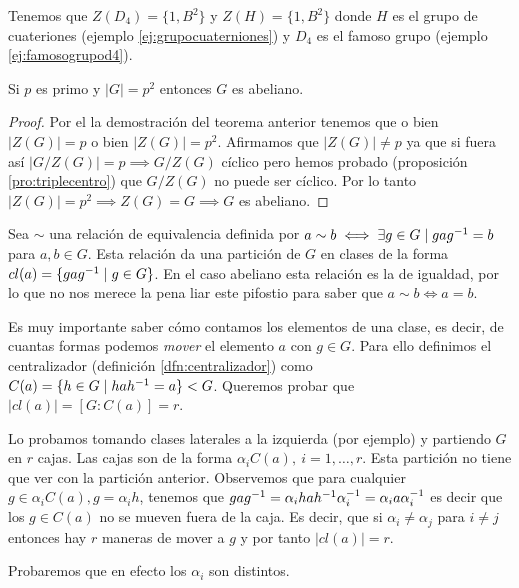 \begin{ej}
	Tenemos que $Z(D_4) = \{1,B^2\}$ y $Z(H) = \{1, B^2\}$ donde $H$ es el grupo de cuateriones (ejemplo \ref{ej:grupocuaterniones}) y $D_4$ es el famoso grupo (ejemplo \ref{ej:famosogrupod4}). 
\end{ej}

\begin{pro}
	\label{pro:primocuadradoabeliano}
	Si $p$ es primo y $|G| = p^2$ entonces $G$ es abeliano.
\end{pro}

\begin{proof}
	Por el la demostración del teorema anterior tenemos que o bien $|Z(G)| = p$ o bien $|Z(G)| = p^2$. Afirmamos que $|Z(G)| \neq p$ ya que si fuera así $|G/Z(G)| = p \implies G/Z(G)$ cíclico pero hemos probado (proposición \ref{pro:triplecentro}) que $G/Z(G)$ no puede ser cíclico. Por lo tanto $|Z(G)| = p^2 \implies Z(G) = G \implies G$ es abeliano.
\end{proof}


\hr

Sea $\sim$ una relación de equivalencia definida por $a\sim b \iff \exists g \in G \mid gag^{-1} = b$ para $a,b \in G$. Esta relación da una partición de $G$ en clases de la forma $cl(a) = \{gag^{-1} \mid g \in G\}$. En el caso abeliano esta relación es la de igualdad, por lo que no nos merece la pena liar este pifostio para saber que $a\sim b \iff a = b$. 

Es muy importante saber cómo contamos los elementos de una clase, es decir, de cuantas formas podemos \textit{mover} el elemento $a$ con $g \in G$. Para ello definimos el centralizador (definición \ref{dfn:centralizador}) como $C(a) = \{h \in G \mid hah^{-1} = a\} < G$. Queremos probar que $|cl(a)| = [G:C(a)] = r$.

Lo probamos tomando clases laterales a la izquierda (por ejemplo) y partiendo $G$ en $r$ cajas. Las cajas son de la forma $\alpha_iC(a),\ i = 1, \dots, r$. Esta partición no tiene que ver con la partición anterior. Observemos que para cualquier $g \in \alpha_i C(a), g = \alpha_i h$, tenemos que $g a g^{-1} = \alpha_i h a h^{-1} \alpha_i^{-1} = \alpha_i a \alpha_i^{-1}$ es decir que los $g \in C(a)$ no se mueven fuera de la caja. Es decir, que si $\alpha_i \neq \alpha_j$ para $i\neq j$ entonces hay $r$ maneras de mover a $g$ y por tanto $|cl(a)| = r$.

Probaremos que en efecto los $\alpha_i$ son distintos.

